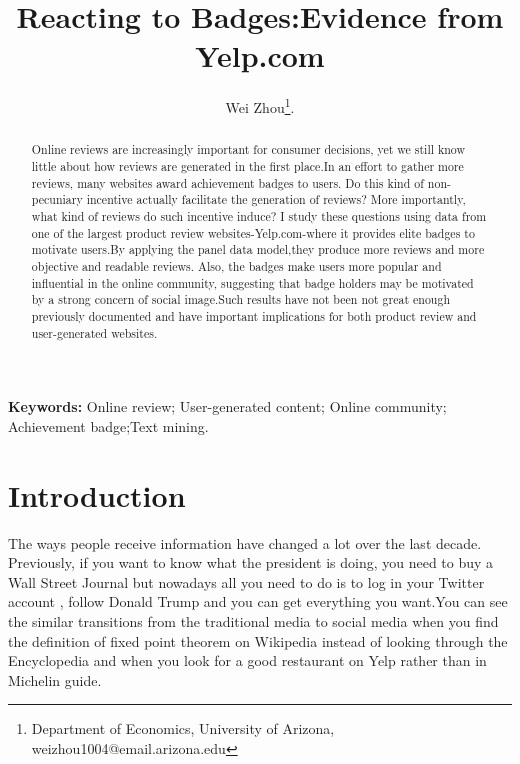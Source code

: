 \documentclass[12pt]{article}%
\begin{document}
\title{Reacting to Badges:Evidence from Yelp.com}
\author{Wei Zhou\thanks{Department of Economics, University of Arizona, 
weizhou1004@email.arizona.edu}.    }
\maketitle

\sloppy%

\onehalfspacing

\begin{abstract}
Online reviews are increasingly important for consumer decisions, yet we still know little about how reviews are generated in the first place.In an effort to gather more reviews, many websites award achievement badges to users. Do this kind of non-pecuniary incentive actually facilitate the generation of reviews? More importantly, what kind of reviews do such incentive induce? I study these questions using data from one of the largest product review websites-Yelp.com-where it provides elite badges to motivate users.By applying the panel data model,they produce more reviews and more objective and readable reviews. Also, the badges make users more popular and influential in the online community, suggesting that badge holders may be motivated by a strong concern of social image.Such results have not been not great enough  previously documented and have important implications for both product review and user-generated websites.


\end{abstract}

\strut

\textbf{Keywords:} Online review; User-generated content; Online community; Achievement badge;Text mining.

\strut



\pagebreak%
\doublespacing %


\section{Introduction}
\label{intro} %

The ways people receive information have changed a lot over the last decade. Previously, if you want to know what the president is doing, you need to buy a Wall Street Journal but nowadays all you need to do is to log in your Twitter account , follow Donald Trump and you can get everything you want.You can see the similar transitions from the traditional media to social media when you find the definition of fixed point theorem on Wikipedia instead of looking through the Encyclopedia and when you look for a good restaurant on Yelp rather than in Michelin guide.
\end{document}
